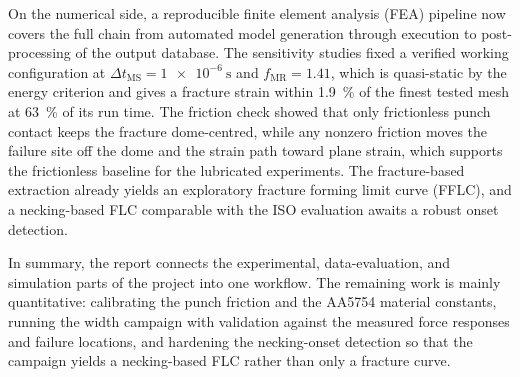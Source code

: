 On the numerical side, a reproducible finite element analysis (FEA) pipeline
now covers the full chain from automated model generation through
 execution to post-processing of the 
output database. The sensitivity studies fixed a verified working
configuration at $\Delta t_\mathrm{MS}=\SI{1e-6}{\second}$ and
$f_\mathrm{MR}=1.41$, which is quasi-static by the energy criterion and
gives a fracture strain within \SI{1.9}{\percent} of the finest tested mesh
at \SI{63}{\percent} of its run time. The friction check
showed that only frictionless punch contact keeps the fracture dome-centred,
while any nonzero friction moves the failure site off the dome and the
strain path toward plane strain, which supports the frictionless baseline
for the lubricated experiments. The fracture-based extraction already yields
an exploratory fracture forming limit curve (FFLC), and a necking-based FLC
comparable with the ISO evaluation awaits a robust onset detection.

In summary, the report connects the experimental, data-evaluation, and
simulation parts of the project into one workflow. The remaining work is
mainly quantitative: calibrating the punch friction and the AA5754 material
constants, running the width campaign with validation against the measured
force responses and failure locations, and hardening the necking-onset
detection so that the campaign yields a necking-based FLC rather than only a
fracture curve.

